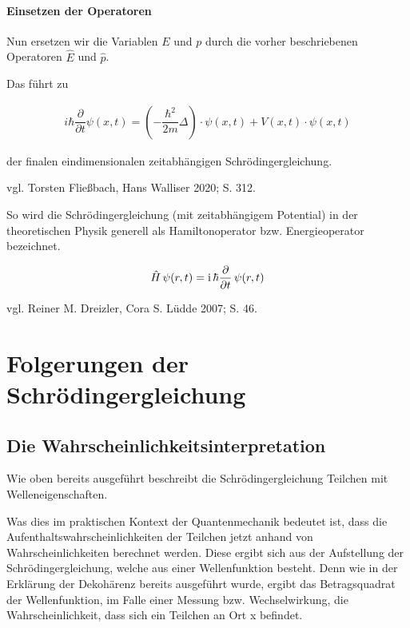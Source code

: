 \documentclass[12pt,oneside, a4paper]{scrbook}
\begin{document}
\subsubsection{Einsetzen der Operatoren}

Nun ersetzen wir die Variablen ${E}$ und ${p}$ durch die vorher beschriebenen Operatoren $\widehat{E}$ und $\widehat{p}$.

Das führt zu

\begin{align}
i\hbar\dfrac {\partial}{\partial t}\psi(x,t)=(-\dfrac {\hbar^{2}}{2m} \Delta) \cdot \psi(x,t) + V(x,t) \cdot \psi(x,t)
\end{align}

der finalen eindimensionalen zeitabhängigen Schrödingergleichung.

vgl. Torsten Fließbach, Hans Walliser 2020; S. 312.

So wird die Schrödingergleichung (mit zeitabhängigem Potential) in der theoretischen Physik generell als Hamiltonoperator bzw. Energieoperator bezeichnet.

\begin{align}
  {\hat  H}\,\psi (r, t) = {\mathrm  i}\,\hbar {\partial  \over \partial t}\,\psi (r, t)
\end{align}

vgl. Reiner M. Dreizler, Cora S. Lüdde 2007; S. 46.

\chapter{Folgerungen der Schrödingergleichung}

\section{Die Wahrscheinlichkeitsinterpretation}

Wie oben bereits ausgeführt beschreibt die Schrödingergleichung Teilchen mit Welleneigenschaften. 

Was dies im praktischen Kontext der Quantenmechanik bedeutet ist, dass die Aufenthaltswahrscheinlichkeiten der Teilchen jetzt anhand von Wahrscheinlichkeiten berechnet werden. Diese ergibt sich aus der Aufstellung der Schrödingergleichung, welche aus einer Wellenfunktion besteht. Denn wie in der Erklärung der Dekohärenz bereits ausgeführt wurde, ergibt das Betragsquadrat der Wellenfunktion, im Falle einer Messung bzw. Wechselwirkung, die Wahrscheinlichkeit, dass sich ein Teilchen an Ort x befindet. 
\end{document}
